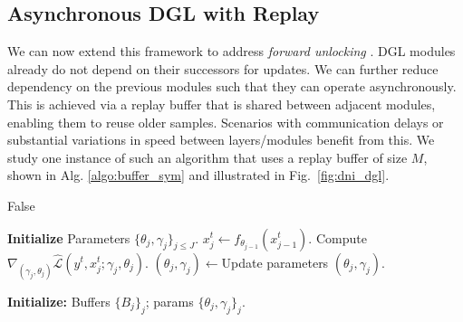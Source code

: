 \documentclass{article}
\begin{document}
\vspace{-4pt}
\subsection{Asynchronous DGL with Replay} \label{sec:asynch}

We can now extend this framework to address
\textit{forward unlocking} \citep{jaderberg2016decoupled}. DGL 
modules already do not depend on their successors for updates. 
We can further reduce dependency on the previous modules such that they can operate asynchronously. 
This is achieved via a replay buffer that is shared between adjacent modules, enabling them to reuse older samples. 
Scenarios with communication delays or substantial variations in speed between layers/modules
benefit from this. 
We study one instance of such an algorithm that uses a replay buffer of size $M$, shown in Alg. \ref{algo:buffer_sym} and illustrated in Fig.~\ref{fig:dni_dgl}. 

\if False
    \begin{algorithm2e}\small
    \caption{Synchronous DGL}\label{algo:basic}
  \SetAlgoLined
  \DontPrintSemicolon
{}
\textbf{Initialize} Parameters $\{\theta_j,\gamma_j\}_{j\leq J}$.\;
{
   {$x^t_j \leftarrow f_{\theta_{j-1}}(x^t_{j-1})$.\;
Compute $\nabla_{(\gamma_j,\theta_j)}\hat{ \mathcal{L}}(y^t,x^t_j;\gamma_j,\theta_j)$.\;
$(\theta_j,\gamma_j)\leftarrow$Update parameters $(\theta_j,\gamma_j)$.
   }
 }
\end{algorithm2e}\begin{algorithm2e}\small
\SetAlgoLined
  \DontPrintSemicolon
 \textbf{Initialize:} Buffers $\{B_j\}_{j}$; params $\{\theta_j,\gamma_j\}_{j}$.\\
    \caption{Asynchronous DGL with Replay\label{algo:buffer_sym}}
    
    \end{algorithm2e}
    
\end{document}

